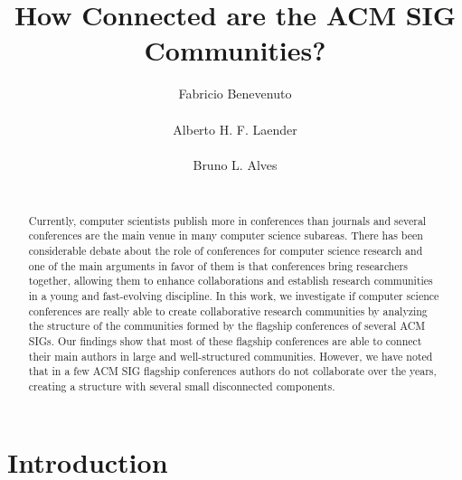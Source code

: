\documentclass{sig-alternate-10pt}
\begin{document}
\makeatletter
\def\@copyrightspace{\relax}
\makeatother
\pagestyle{empty}

\title{How Connected are the ACM SIG Communities?}
\author{
\alignauthor Fabricio Benevenuto\\
       \\
\alignauthor Alberto H. F. Laender\\
       \\
\alignauthor Bruno L. Alves\\
       \\
}


\maketitle
\begin{abstract}
Currently, computer scientists publish more in conferences than journals and several conferences are the main venue in many computer science subareas. There has been considerable debate about the role of conferences for computer science research and one of the main arguments in favor of them is that conferences bring researchers together, allowing them to enhance collaborations and establish research communities in a young and fast-evolving discipline. In this work, we investigate if computer science conferences are really able to create collaborative research communities by analyzing the structure of the communities formed by the flagship conferences of several ACM SIGs. Our findings show that most of these flagship conferences are able to connect their main authors in large and well-structured communities. However, we have noted that in a few ACM SIG flagship conferences authors do not collaborate over the years, creating a structure with several small disconnected components.
\end{abstract}


\section{Introduction}
\end{document}
